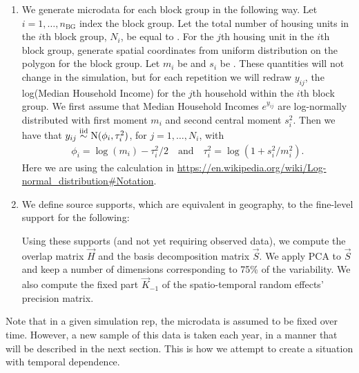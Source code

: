 \documentclass[12pt]{article}
\begin{document}
\begin{enumerate}
\item \label{step:means} We generate microdata for each block group in the following way. Let $i = 1, \ldots, n_\text{BG}$ index the block group. Let the total number of housing units in the $i$th block group, $N_i$, be equal to . For the $j$th housing unit in the $i$th block group, generate spatial coordinates from uniform distribution on the polygon for the block group. Let $m_i$ be  and $s_i$ be . These quantities will not change in the simulation, but for each repetition we will redraw $y_{ij}$, the log(Median Household Income) for the $j$th household within the $i$th block group. We first assume that Median Household Incomes $e^{y_{ij}}$ are log-normally distributed with first moment $m_i$ and second central moment $s_i^2$. Then we have that $y_{ij} \stackrel{\text{iid}}{\sim} \text{N}(\phi_i, \tau_i^2)$, for $j = 1, \ldots, N_i$, with
%
\begin{align*}
\phi_i = \log(m_i) - \tau_i^2 / 2
\quad \text{and} \quad
\tau_i^2 = \log(1 + s_i^2 / m_i^2).
\end{align*}
%
Here we are using the calculation in \url{https://en.wikipedia.org/wiki/Log-normal_distribution#Notation}.

\item We define source supports, which are equivalent in geography, to the fine-level support for the following:
%
%
Using these supports (and not yet requiring observed data), we compute the overlap matrix $\vec{H}$ and the basis decomposition matrix $\vec{S}$. We apply PCA to $\vec{S}$ and keep a number of dimensions corresponding to 75\% of the variability. We also compute the fixed part $\vec{K}_{-1}$ of the spatio-temporal random effects' precision matrix.
\end{enumerate}

Note that in a given simulation rep, the microdata is assumed to be fixed over time. However, a new sample of this data is taken each year, in a manner that will be described in the next section. This is how we attempt to create a situation with temporal dependence.
\end{document}
